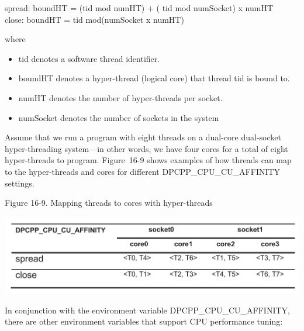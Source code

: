 \begin{tcolorbox}[colback=green!5!white,colframe=green!75!black]
spread: boundHT = (tid mod numHT) + ( tid mod numSocket) x numHT \\
close: boundHT = tid mod(numSocket x numHT)
\end{tcolorbox}

where\par

\begin{itemize}
	\item tid denotes a software thread identifier.
	\item boundHT denotes a hyper-thread (logical core) that thread tid is bound to.
	\item numHT denotes the number of hyper-threads per socket.
	\item numSocket denotes the number of sockets in the system
\end{itemize}

Assume that we run a program with eight threads on a dual-core dual-socket hyper-threading system—in other words, we have four cores for a total of eight hyper-threads to program. Figure 16-9 shows examples of how threads can map to the hyper-threads and cores for different DPCPP\_CPU\_CU\_AFFINITY settings.\par

\hspace*{\fill} \par %
Figure 16-9. Mapping threads to cores with hyper-threads
\begin{center}
	\includegraphics[width=1.0\textwidth]{content/chapter-16/images/6}
\end{center}

In conjunction with the environment variable DPCPP\_CPU\_CU\_AFFINITY, there are other environment variables that support CPU performance tuning:\par


